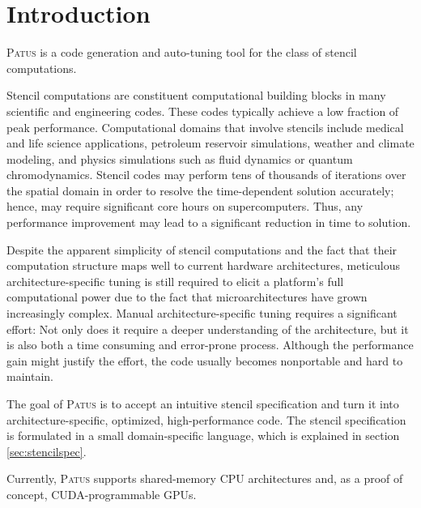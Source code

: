 \section{Introduction}

\textsc{Patus} is a code generation and auto-tuning tool for the class of stencil computations.

Stencil computations are constituent computational building blocks in many
scientific and engineering codes. These codes typically achieve a low
fraction of peak performance. Computational domains that involve stencils
include medical and life science applications, petroleum reservoir
simulations, weather and climate modeling, and physics simulations such as
fluid dynamics or quantum chromodynamics.
Stencil codes may perform tens of thousands of
iterations over the spatial domain in order to resolve the time-dependent
solution accurately; hence, may require significant core hours on
supercomputers. Thus, any performance improvement may lead to a
significant reduction in time to solution.

Despite the apparent simplicity of stencil computations and the fact that their computation structure maps well to 
current hardware architectures, meticulous architecture-specific tuning is still required to elicit a platform's full computational power
due to the fact that microarchitectures have grown increasingly complex.
Manual architecture-specific tuning requires a significant effort:
Not only does it require a deeper understanding of the architecture, but it is also both a time consuming and
error-prone process. Although the performance gain might justify the effort, the code usually becomes nonportable
and hard to maintain.

The goal of \textsc{Patus} is to accept an intuitive stencil specification and turn it into architecture-specific, optimized, high-performance code.
The stencil specification is formulated in a small domain-specific language, which is explained in section \ref{sec:stencilspec}.

Currently, \textsc{Patus} supports shared-memory CPU architectures and, as a proof of concept, CUDA-programmable GPUs.